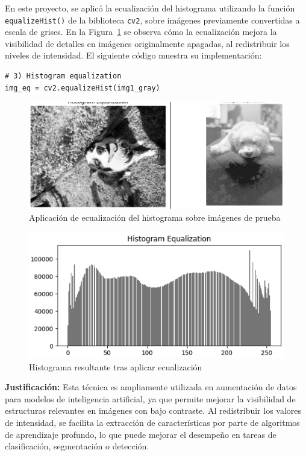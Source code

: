 \documentclass[12pt,letterpaper]{article}
\begin{document}
En este proyecto, se aplicó la ecualización del histograma utilizando la función \texttt{equalizeHist()} de la biblioteca \texttt{cv2}, sobre imágenes previamente convertidas a escala de grises. En la Figura~\ref{fig:ecualizacion_imagen} se observa cómo la ecualización mejora la visibilidad de detalles en imágenes originalmente apagadas, al redistribuir los niveles de intensidad. El siguiente código muestra su implementación:

\begin{verbatim}
# 3) Histogram equalization
img_eq = cv2.equalizeHist(img1_gray)
\end{verbatim}

\begin{figure}[H]
  \centering
  \includegraphics[width=0.8\linewidth]{figuras/ecualizacion_imagen.png}
  \caption{Aplicación de ecualización del histograma sobre imágenes de prueba}
  \label{fig:ecualizacion_imagen}
\end{figure}

\begin{figure}[H]
  \centering
  \includegraphics[width=0.8\linewidth]{figuras/ecualizacion_histograma.png}
  \caption{Histograma resultante tras aplicar ecualización}
  \label{fig:ecualizacion_histograma}
\end{figure}

\textbf{Justificación:} Esta técnica es ampliamente utilizada en aumentación de datos para modelos de inteligencia artificial, ya que permite mejorar la visibilidad de estructuras relevantes en imágenes con bajo contraste. Al redistribuir los valores de intensidad, se facilita la extracción de características por parte de algoritmos de aprendizaje profundo, lo que puede mejorar el desempeño en tareas de clasificación, segmentación o detección.
\end{document}
